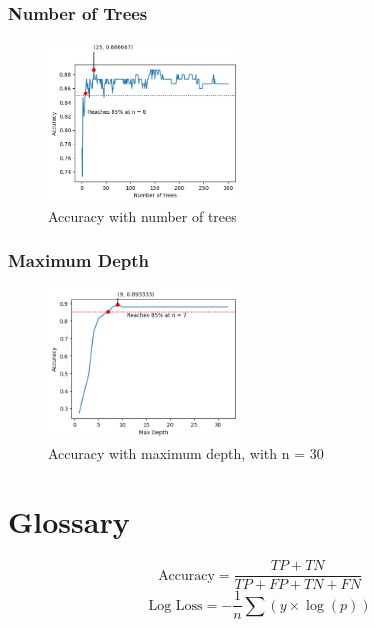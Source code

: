 \documentclass{assignmeownt}
\begin{document}
\subsubsection*{Number of Trees}
\begin{figure}[H]
    \centering
    \includegraphics[width=0.45\textwidth]{images/notrees.png}
    \caption{Accuracy with number of trees}
    \label{fig:9}
\end{figure}
\subsubsection*{Maximum Depth}
\begin{figure}[H]
    \centering
    \includegraphics[width=0.45\textwidth]{images/deptrees.png}
    \caption{Accuracy with maximum depth, with n = 30}
    \label{fig:10}
\end{figure}
 

\bigskip


\section{Glossary}
$$\text{Accuracy} = \frac{TP+TN}{TP+FP+TN+FN}$$
$$\text{Log Loss} = -\frac{1}{n}\sum{(y \times \log{(p)})}$$

\end{document}
